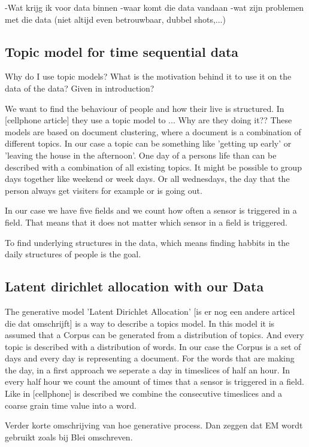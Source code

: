 \documentclass[11pt,a4paper]{report}
\begin{document}
-Wat krijg ik voor data binnen
-waar komt die data vandaan
-wat zijn problemen met die data (niet altijd even betrouwbaar, dubbel shots,...)


\subsection{Topic model for time sequential data}
Why do I use topic models? What is the motivation behind it to use it on the data of the data? Given in introduction?

We want to find the behaviour of people and how their live is structured. In [cellphone article] they use a topic model to ... Why are they doing it??
These models are based on document clustering, where a document is a combination of different topics. In our case a topic can be something like 'getting up early' or 'leaving the house in the afternoon'. One day of a persons life than can be described with a combination of all existing topics. It might be possible to group days together like weekend or week days. Or all wednesdays, the day that the person always get visiters for example or is going out. 



In our case we have five fields and we count how often a sensor is triggered in a field. That means that it does not matter which sensor in a field is triggered.



To find underlying structures in the data, which means finding habbits in the daily structures of people is the goal.


\subsection{Latent dirichlet allocation with our Data}
The generative model 'Latent Dirichlet Allocation' [is er nog een andere articel die dat omschrijft] is a way to describe a topics model. In this model it is assumed that a Corpus can be generated from a distribution of topics. And every topic is described with a distribution of words.
In our case the Corpus is a set of days and every day is representing a document. For the words that are making the day, in a first approach we seperate a day in timeslices of half an hour. In every half hour we count the amount of times that a sensor is triggered in a field. Like in [cellphone] is described we combine the consecutive timeslices and a coarse grain time value into a word.

Verder korte omschrijving van hoe generative process. Dan zeggen dat EM wordt gebruikt zoals bij Blei omschreven.
\end{document}
